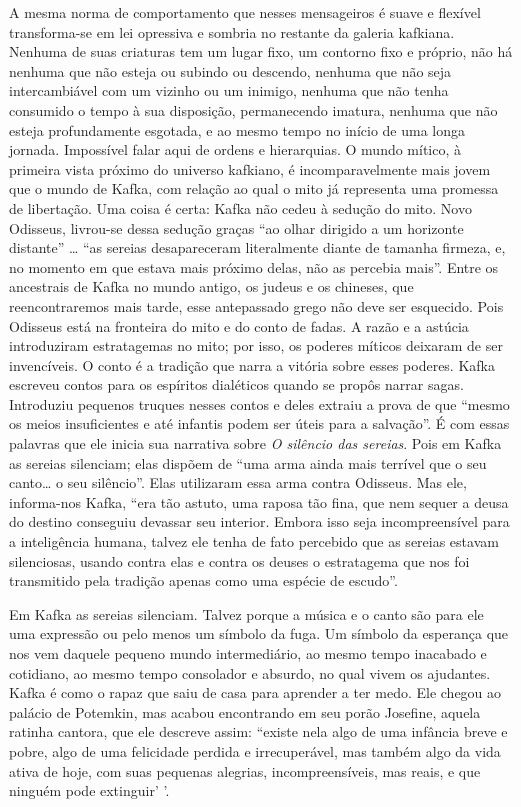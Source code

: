 A mesma norma de comportamento que nesses mensageiros é suave e flexível
transforma-se em lei opressiva e sombria no restante da galeria
kafkiana. Nenhuma de suas criaturas tem um lugar fixo, um contorno fixo
e próprio, não há nenhuma que não esteja ou subindo ou descendo, nenhuma
que não seja intercambiável com um vizinho ou um inimigo, nenhuma que
não tenha consumido o tempo à sua disposição, permanecendo imatura,
nenhuma que não esteja profundamente esgotada, e ao mesmo tempo no
início de uma longa jornada. Impossível falar aqui de ordens e
hierarquias. O mundo mítico, à primeira vista próximo do universo
kafkiano, é incomparavelmente mais jovem que o mundo de Kafka, com
relação ao qual o mito já representa uma promessa de libertação. Uma
coisa é certa: Kafka não cedeu à sedução do mito. Novo Odisseus,
livrou-se dessa sedução graças ``ao olhar dirigido a um horizonte
distante'' \ldots{} ``as sereias desapareceram literalmente diante de tamanha
firmeza, e, no momento em que estava mais próximo delas, não as percebia
mais''. Entre os ancestrais de Kafka no mundo antigo, os judeus e os
chineses, que reencontraremos mais tarde, esse antepassado grego não
deve ser esquecido. Pois Odisseus está na fronteira do mito e do conto
de fadas. A razão e a astúcia introduziram estratagemas no mito; por
isso, os poderes míticos deixaram de ser invencíveis. O conto é a
tradição que narra a vitória sobre esses poderes. Kafka escreveu contos
para os espíritos dialéticos quando se propôs narrar sagas. Introduziu
pequenos truques nesses contos e deles extraiu a prova de que ``mesmo os
meios insuficientes e até infantis podem ser úteis para a salvação''. É
com essas palavras que ele inicia sua narrativa sobre \textit{O silêncio das
sereias}. Pois em Kafka as sereias silenciam; elas dispõem de ``uma arma
ainda mais terrível que o seu canto\ldots{} o seu silêncio''. Elas utilizaram
essa arma contra Odisseus. Mas ele, informa-nos Kafka, ``era tão astuto,
uma raposa tão fina, que nem sequer a deusa do destino conseguiu
devassar seu interior. Embora isso seja incompreensível para a
inteligência humana, talvez ele tenha de fato percebido que as sereias
estavam silenciosas, usando contra elas e contra os deuses o estratagema
que nos foi transmitido pela tradição apenas como uma espécie de
escudo''.

Em Kafka as sereias silenciam. Talvez porque a música e o canto são para
ele uma expressão ou pelo menos um símbolo da fuga. Um símbolo da
esperança que nos vem daquele pequeno mundo intermediário, ao mesmo
tempo inacabado e cotidiano, ao mesmo tempo consolador e absurdo, no
qual vivem os ajudantes. Kafka é como o rapaz que saiu de casa para
aprender a ter medo. Ele chegou ao palácio de Potemkin, mas acabou
encontrando em seu porão Josefine, aquela ratinha cantora, que ele
descreve assim: ``existe nela algo de uma infância breve e pobre, algo
de uma felicidade perdida e irrecuperável, mas também algo da vida ativa
de hoje, com suas pequenas alegrias, incompreensíveis, mas reais, e que
ninguém pode extinguir' '.

